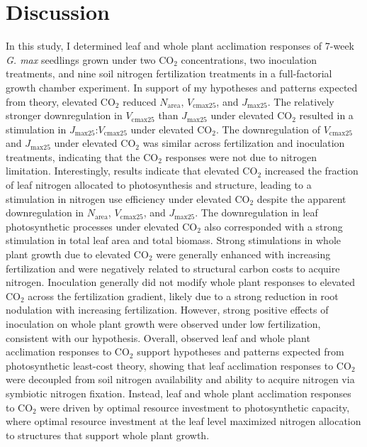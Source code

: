 \section{Discussion}
In this study, I determined leaf and whole plant acclimation responses of 7-week \textit{G. max} seedlings grown under two CO$_2$ concentrations, two inoculation treatments, and nine soil nitrogen fertilization treatments in a full-factorial growth chamber experiment. In support of my hypotheses and patterns expected from theory, elevated CO$_2$ reduced $N_\mathrm{area}$, $V_\mathrm{cmax25}$, and $J_\mathrm{max25}$. The relatively stronger downregulation in $V_\mathrm{cmax25}$ than $J_\mathrm{max25}$ under elevated CO$_2$ resulted in a stimulation in $J_\mathrm{max25}$:$V_\mathrm{cmax25}$ under elevated CO$_2$. The downregulation of $V_\mathrm{cmax25}$ and $J_\mathrm{max25}$ under elevated CO$_2$ was similar across fertilization and inoculation treatments, indicating that the CO$_2$ responses were not due to nitrogen limitation. Interestingly, results indicate that elevated CO$_2$ increased the fraction of leaf nitrogen allocated to photosynthesis and structure, leading to a stimulation in nitrogen use efficiency under elevated CO$_2$ despite the apparent downregulation in $N_\mathrm{area}$, $V_\mathrm{cmax25}$, and $J_\mathrm{max25}$. The downregulation in leaf photosynthetic processes under elevated CO$_2$ also corresponded with a strong stimulation in total leaf area and total biomass. Strong stimulations in whole plant growth due to elevated CO$_2$ were generally enhanced with increasing fertilization and were negatively related to structural carbon costs to acquire nitrogen. Inoculation generally did not modify whole plant responses to elevated CO$_2$ across the fertilization gradient, likely due to a strong reduction in root nodulation with increasing fertilization. However, strong positive effects of inoculation on whole plant growth were observed under low fertilization, consistent with our hypothesis. Overall, observed leaf and whole plant acclimation responses to CO$_2$ support hypotheses and patterns expected from photosynthetic least-cost theory, showing that leaf acclimation responses to CO$_2$ were decoupled from soil nitrogen availability and ability to acquire nitrogen via symbiotic nitrogen fixation. Instead, leaf and whole plant acclimation responses to CO$_2$ were driven by optimal resource investment to photosynthetic capacity, where optimal resource investment at the leaf level maximized nitrogen allocation to structures that support whole plant growth.

